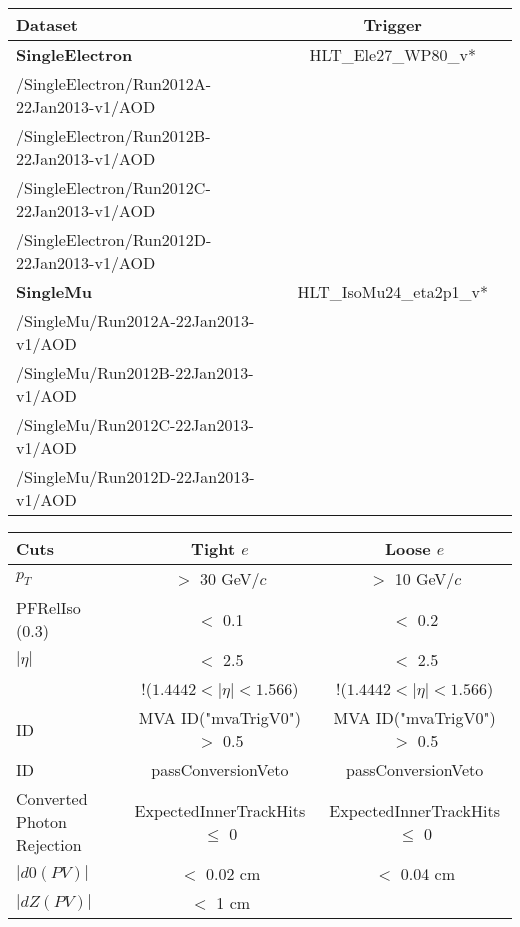 \documentclass[landscape]{article}
\begin{document}
\begin{small}
  
  \begin{center}

    \begin{tabular}{ | l | c | c | }
      \hline \hline
      Dataset & Trigger \\ \hline
      \textbf{SingleElectron} & HLT\_Ele27\_WP80\_v* \\
      /SingleElectron/Run2012A-22Jan2013-v1/AOD & \\
      /SingleElectron/Run2012B-22Jan2013-v1/AOD & \\
      /SingleElectron/Run2012C-22Jan2013-v1/AOD & \\
      /SingleElectron/Run2012D-22Jan2013-v1/AOD & \\ \hline
      \textbf{SingleMu} & HLT\_IsoMu24\_eta2p1\_v* \\
      /SingleMu/Run2012A-22Jan2013-v1/AOD & \\
      /SingleMu/Run2012B-22Jan2013-v1/AOD & \\
      /SingleMu/Run2012C-22Jan2013-v1/AOD & \\
      /SingleMu/Run2012D-22Jan2013-v1/AOD & \\ 
      \hline
      \hline
    \end{tabular}

    \vspace{10 mm}

    \begin{tabular}{ | l | c | c | }
      \hline \hline
      Cuts & Tight $e$ & Loose $e$ \\ \hline
      $p_{T}$ & $>$ 30 GeV/$c$ & $>$ 10 GeV/$c$ \\ \hline
      PFRelIso (0.3) & $<$ 0.1 & $<$ 0.2 \\ \hline
      $|\eta|$ & $<$ 2.5 & $<$ 2.5 \\
       & !($1.4442 < |\eta| < 1.566$) & !($1.4442 < |\eta| < 1.566$) \\ \hline
      ID & MVA ID("mvaTrigV0") $>$ 0.5 & MVA ID("mvaTrigV0") $>$ 0.5 \\ \hline
      ID & passConversionVeto & passConversionVeto \\ \hline
      Converted Photon Rejection & ExpectedInnerTrackHits $\leq$ 0 & ExpectedInnerTrackHits $\leq$ 0 \\ \hline
      $|d0(PV)|$ & $<$ 0.02 cm & $<$ 0.04 cm \\ \hline
      $|dZ(PV)|$ & $<$ 1 cm & \\
      \hline \hline
    \end{tabular}


\end{center}
\end{small}
\end{document}
